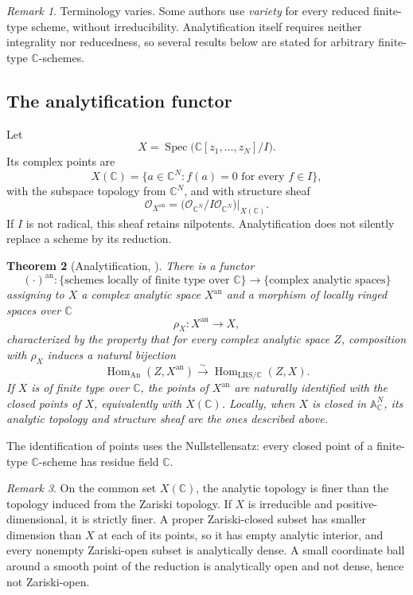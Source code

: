 \documentclass[11pt,reqno]{amsart}
\newtheorem{theorem}{Theorem}[section]
\theoremstyle{definition}
\theoremstyle{remark}
\newtheorem{remark}[theorem]{Remark}
\newcommand{\C}{\mathbb{C}}
\newcommand{\AAA}{\mathbb{A}}
\newcommand{\OO}{\mathcal{O}}
\newcommand{\Xan}{X^{\mathrm{an}}}
\DeclareMathOperator{\Spec}{Spec}
\DeclareMathOperator{\Hom}{Hom}
\begin{document}
\begin{remark}
\label{rem:conventions-variety}
Terminology varies. Some authors use \emph{variety} for every reduced
finite-type scheme, without irreducibility. Analytification itself requires
neither integrality nor reducedness, so several results below are stated for
arbitrary finite-type $\C$-schemes.
\end{remark}

\subsection{The analytification functor}

Let
\[
X=\Spec\bigl(\C[z_1,\dots,z_N]/I\bigr).
\]
Its complex points are
\[
X(\C)=\{a\in\C^N:f(a)=0\text{ for every }f\in I\},
\]
with the subspace topology from $\C^N$, and with structure sheaf
\[
\OO_{\Xan}
=\bigl(\OO_{\C^N}/I\OO_{\C^N}\bigr)\big|_{X(\C)}.
\]
If $I$ is not radical, this sheaf retains nilpotents. Analytification does not
silently replace a scheme by its reduction.

\begin{theorem}[Analytification, {\cite[Exp.~XII, Thm.\ and Def.~1.1]{sga1}}]
\label{thm:analytification}
There is a functor
\[
(\cdot)^{\mathrm{an}}:
\{\text{schemes locally of finite type over }\C\}
\longrightarrow
\{\text{complex analytic spaces}\}
\]
assigning to $X$ a complex analytic space $\Xan$ and a morphism of locally
ringed spaces over $\C$
\[
\rho_X:\Xan\longrightarrow X,
\]
characterized by the property that for every complex analytic space $Z$,
composition with $\rho_X$ induces a natural bijection
\[
\Hom_{\mathrm{An}}(Z,\Xan)
\xrightarrow{\sim}
\Hom_{\mathrm{LRS}/\C}(Z,X).
\]
If $X$ is of finite type over $\C$, the points of $\Xan$ are naturally
identified with the closed points of $X$, equivalently with $X(\C)$. Locally,
when $X$ is closed in $\AAA^N_{\C}$, its analytic topology and structure sheaf
are the ones described above.
\end{theorem}

The identification of points uses the Nullstellensatz: every closed point of a
finite-type $\C$-scheme has residue field $\C$.

\begin{remark}
\label{rem:topologies}
On the common set $X(\C)$, the analytic topology is finer than the topology
induced from the Zariski topology. If $X$ is irreducible and
positive-dimensional, it is strictly finer. A proper Zariski-closed subset
has smaller dimension than $X$ at each of its points, so it has empty
analytic interior, and every nonempty Zariski-open subset is analytically
dense. A small coordinate ball around a smooth point of the reduction is
analytically open and not dense, hence not Zariski-open.
\end{remark}
\end{document}

